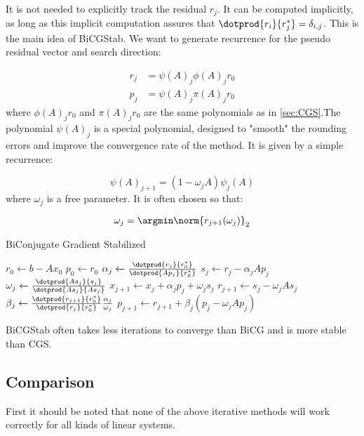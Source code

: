 It is not needed to explicitly track the residual $r_j$. It can be computed implicitly, as long as this implicit computation assures that $\dotprod{r_i}{r^*_j} = \delta_{i,j}$. This is the main idea of BiCGStab. We want to generate recurrence for the pseudo residual vector and search direction:

\begin{align}
	r_j &= \psi(A)_j \phi(A)_j r_0 \\
	p_j &= \psi(A)_j \pi(A)_j r_0
\end{align}
where $\phi(A)_jr_0$ and $\pi(A)_jr_0$ are the same polynomials as in \cref{sec:CGS}.The polynomial $\psi(A)_j$ is a special polynomial, designed to "smooth" the rounding errors and improve the convergence rate of the method. It is given by a simple recurrence:

\begin{equation}
	\psi(A)_{j+1} = (1 - \omega_j A)\psi_j(A)
\end{equation}
where $\omega_j$ is a free parameter. It is often chosen so that:

\begin{equation}
	\omega_j = \argmin \norm{r_{j+1}(\omega_j)}_2
\end{equation}

\begin{algorithm}[H]
 \centering
 \caption{BiConjugate Gradient Stabilized}\label{alg:BiCGStab}
 \begin{algorithmic}[1]
			\State $r_0 \gets b - Ax_0$
			\State $p_0 \gets r_0$
				\State $\alpha_j \gets \frac{\dotprod{r_j}{r^*_0}}{\dotprod{Ap_j}{r^*_0}}$
				\State $s_j \gets r_j - \alpha_j A p_j$
				\State $\omega_j \gets \frac{\dotprod{A s_j}{s_j}}{\dotprod{A s_j}{A s_j}}$
				\State $x_{j+1} \gets x_j + \alpha_j p_j + \omega_j s_j$
				\State $r_{j+1} \gets s_j - \omega_j A s_j$
				\State $\beta_j \gets \frac{\dotprod{r_{j+1}}{r^*_0}}{\dotprod{r_j}{r^*_0}} \frac{\alpha_j}{\omega_j}$
				\State $p_{j+1} \gets r_{j+1} + \beta_j(p_j - \omega_j A p_j)$
			\EndFor
		\EndProcedure
 \end{algorithmic}
\end{algorithm}

BiCGStab often takes less iterations to converge than BiCG and is more stable than CGS.
\subsection{Comparison}
First it should be noted that none of the above iterative methods will work correctly for all kinds of linear systems.

